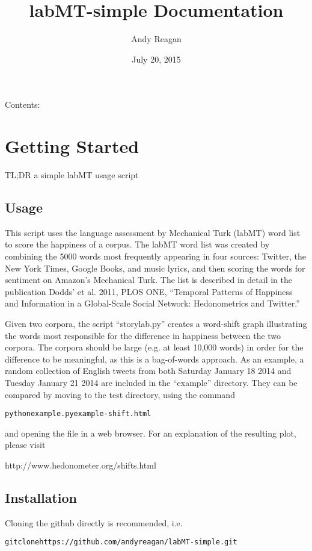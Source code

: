 \documentclass[letterpaper,10pt,english]{sphinxmanual}
\title{labMT-simple Documentation}
\date{July 20, 2015}
\author{Andy Reagan}
\begin{document}
\maketitle
\tableofcontents
{}\label{index::doc}


Contents:


\chapter{Getting Started}
\label{getting-started:welcome-to-labmt-simple-s-documentation}\label{getting-started:getting-started}\label{getting-started::doc}
TL;DR
a simple labMT usage script


\section{Usage}
\label{getting-started:usage}
This script uses the language assessment by Mechanical Turk (labMT) word list to score the happiness of a corpus. The labMT word list was created by combining the 5000 words most frequently appearing in four sources: Twitter, the New York Times, Google Books, and music lyrics, and then scoring the words for sentiment on Amazon's Mechanical Turk. The list is described in detail in the publication Dodds' et al. 2011, PLOS ONE, ``Temporal Patterns of Happiness and Information in a Global-Scale Social Network: Hedonometrics and Twitter.''

Given two corpora, the script ``storylab.py'' creates a word-shift graph illustrating the words most responsible for the difference in happiness between the two corpora. The corpora should be large (e.g. at least 10,000 words) in order for the difference to be meaningful, as this is a bag-of-words approach. As an example, a random collection of English tweets from both Saturday January 18 2014 and Tuesday January 21 2014 are included in the ``example'' directory. They can be compared by moving to the test directory, using the command
\begin{alltt}
python example.py example-shift.html
\end{alltt}

and opening the file  in a web browser. For an explanation of the resulting plot, please visit

http://www.hedonometer.org/shifts.html


\section{Installation}
\label{getting-started:installation}
Cloning the github directly is recommended, i.e.
\begin{alltt}
git clone https://github.com/andyreagan/labMT-simple.git
\end{alltt}
\end{document}
